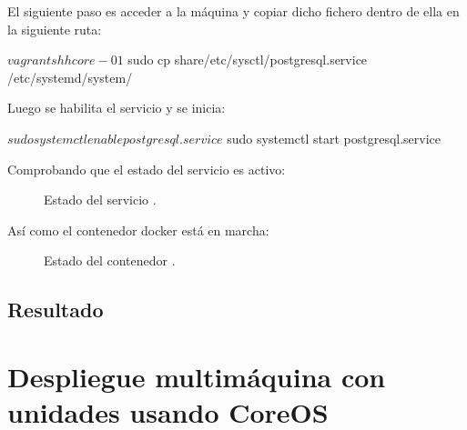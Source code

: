 El siguiente paso es acceder a la máquina  y copiar dicho fichero dentro de ella en la siguiente ruta:

\begin{code}
$ vagrant shh core-01
$ sudo cp share/etc/sysctl/postgresql.service /etc/systemd/system/
\end{code}

Luego se habilita el servicio y se inicia:
\begin{code}
$ sudo systemctl enable postgresql.service
$ sudo systemctl start postgresql.service
\end{code}

Comprobando que el estado del servicio es activo:

\begin{figure}[H]
\caption{Estado del servicio .\label{fig:figure_placement_example}}
\end{figure}

Así como el contenedor docker está en marcha:

\begin{figure}[H]
\caption{Estado del contenedor .\label{fig:figure_placement_example}}
\end{figure}

\subsection{Resultado}

\section{Despliegue multimáquina con unidades usando CoreOS}

